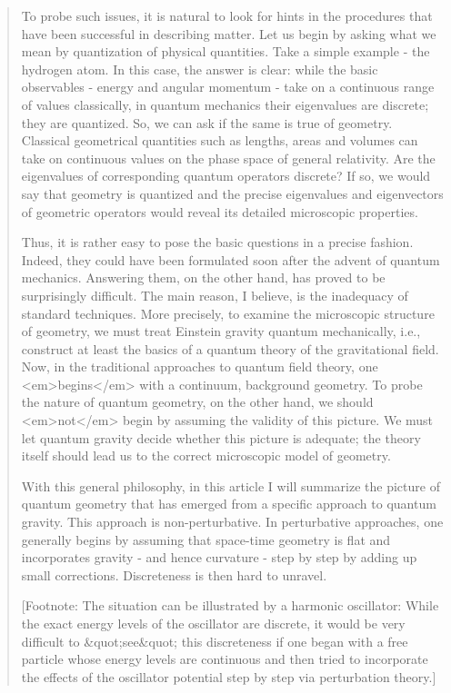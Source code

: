 \begin{quote}
To probe such issues, it is natural to look for hints in the
procedures that have been successful in describing matter.  Let us
begin by asking what we mean by quantization of physical quantities.
Take a simple example - the hydrogen atom.  In this case, the answer is
clear: while the basic observables - energy and angular momentum -
take on a continuous range of values classically, in quantum mechanics
their eigenvalues are discrete; they are quantized.  So, we can ask if
the same is true of geometry.  Classical geometrical quantities such as
lengths, areas and volumes can take on continuous values on the phase
space of general relativity.  Are the eigenvalues of corresponding
quantum operators discrete?  If so, we would say that geometry is
quantized and the precise eigenvalues and eigenvectors of geometric
operators would reveal its detailed microscopic properties.

Thus, it is rather easy to pose the basic questions in a precise
fashion.  Indeed, they could have been formulated soon after the advent
of quantum mechanics.  Answering them, on the other hand, has proved to
be surprisingly difficult.  The main reason, I believe, is the
inadequacy of standard techniques.  More precisely, to examine the
microscopic structure of geometry, we must treat Einstein gravity
quantum mechanically, i.e., construct at least the basics of a quantum
theory of the gravitational field.  Now, in the traditional approaches
to quantum field theory, one <em>begins</em> with a continuum, background
geometry.  To probe the nature of quantum geometry, on the other hand,
we should <em>not</em> begin by assuming the validity of this picture.  We must
let quantum gravity decide whether this picture is adequate; the theory
itself should lead us to the correct microscopic model of geometry.

With this general philosophy, in this article I will summarize the
picture of quantum geometry that has emerged from a specific approach to
quantum gravity.  This approach is non-perturbative.  In perturbative
approaches, one generally begins by assuming that space-time geometry is
flat and incorporates gravity - and hence curvature - step by step by
adding up small corrections.  Discreteness is then hard to unravel.

[Footnote: The situation can be illustrated by a harmonic oscillator:
While the exact energy levels of the oscillator are discrete, it would
be very difficult to &quot;see&quot; this discreteness if one began with a free
particle whose energy levels are continuous and then tried to
incorporate the effects of the oscillator potential step by step via
perturbation theory.]   


\end{quote}
